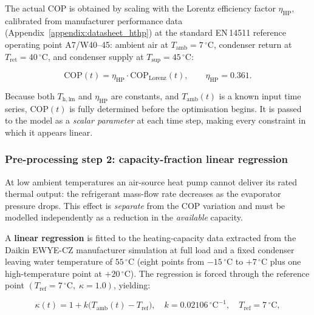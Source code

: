 \documentclass[11pt,a4paper]{report}
\begin{document}
The actual COP is obtained by scaling with the Lorentz efficiency factor
$\eta_\mathrm{HP}$, calibrated from manufacturer performance data
(Appendix~\ref{appendix:datasheet_hthp}) at the standard EN\,14511 reference operating
point A7/W40--45: ambient air at $T_\mathrm{amb} = 7\,^{\circ}$C, condenser return at
$T_\mathrm{ret} = 40\,^{\circ}$C, and condenser supply at $T_\mathrm{sup} = 45\,^{\circ}$C:

\begin{equation}
    \mathrm{COP}(t) = \eta_\mathrm{HP} \cdot \mathrm{COP}_\mathrm{Lorenz}(t),
    \qquad \eta_\mathrm{HP} = 0.361.
    \label{eq:cop_actual_t}
\end{equation}

\noindent Because both $T_\mathrm{h,lm}$ and $\eta_\mathrm{HP}$ are constants, and
$T_\mathrm{amb}(t)$ is a known input time series, $\mathrm{COP}(t)$ is fully determined
before the optimisation begins.
It is passed to the model as a \emph{scalar parameter} at each time step, making every
constraint in which it appears linear.

\subsubsection{Pre-processing step 2: capacity-fraction linear regression}
\label{sub:hthp_capfrac}

At low ambient temperatures an air-source heat pump cannot deliver its rated thermal output:
the refrigerant mass-flow rate decreases as the evaporator pressure drops.
This effect is \emph{separate} from the COP variation and must be modelled independently as
a reduction in the \emph{available} capacity.

A \textbf{linear regression} is fitted to the heating-capacity data extracted from the
Daikin EWYE-CZ manufacturer simulation at full load and a fixed condenser leaving water
temperature of $55\,^{\circ}$C (eight points from $-15\,^{\circ}$C to $+7\,^{\circ}$C
plus one high-temperature point at $+20\,^{\circ}$C).
The regression is forced through the reference point $(T_\mathrm{ref} = 7\,^{\circ}\mathrm{C},\;
\kappa = 1.0)$, yielding:

\begin{equation}
    \kappa(t) = 1 + k \bigl(T_\mathrm{amb}(t) - T_\mathrm{ref}\bigr),
    \quad k = 0.02106\,^{\circ}\mathrm{C}^{-1},\quad T_\mathrm{ref} = 7\,^{\circ}\mathrm{C},
    \label{eq:capfrac}
\end{equation}
\end{document}
